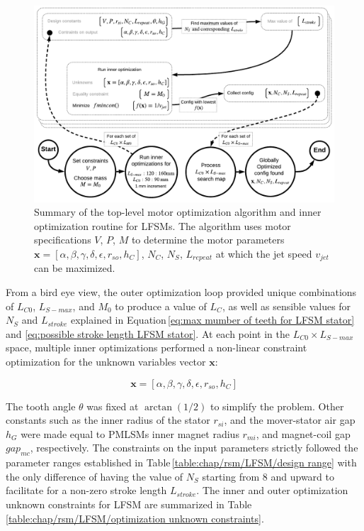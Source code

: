                 
                \begin{figure}
                  \centering
                  \includegraphics[width=5.9in]{chap4/images2/RSM_LFSM_optimization.pdf}
                  \caption{Summary of the top-level motor optimization algorithm and inner optimization routine for \acsp{LFSM}. The algorithm uses motor specifications $V$, $P$, $M$ to determine the motor parameters $\textbf{x}=[\alpha,\beta,\gamma,\delta,\epsilon,r_{so},h_C]$, $N_C$, $N_S$, $L_{repeat}$ at which the jet speed $v_{jet}$ can be maximized.}
                  \label{fig:chapter/rsm/fsm/top level optmization}
                \end{figure}
                
                
                From a bird eye view, the outer optimization loop provided unique combinations of $L_{C0}$, $L_{S-max}$, and $M_0$ to produce a value of $L_C$, as well as sensible values for $N_S$ and $L_{stroke}$ explained in Equation\,\ref{eq:max mumber of teeth for LFSM stator} and \ref{eq:possible stroke length LFSM stator}. At each point in the $L_{C0} \times L_{S-max}$ space, multiple inner optimizations performed a non-linear constraint optimization for the unknown variables vector $\textbf{x}$:
            
            
                \begin{equation}
                    \textbf{x} = \left[ \alpha,\beta,\gamma,\delta,\epsilon,r_{so},h_{C} \right]
                    \label{eq:inner optimization x of FSM}
                \end{equation}
                
                
                The tooth angle $\theta$ was fixed at $\arctan(1/2)$ to simplify the problem. Other constants such as the inner radius of the stator $r_{si}$, and the mover-stator air gap $h_G$ were made equal to \acsp{PMLSM} inner magnet radius $r_{mi}$, and magnet-coil gap $gap_{mc}$, respectively. The constraints on the input parameters strictly followed the parameter ranges established in Table\,\ref{table:chap/rsm/LFSM/design range} with the only difference of having the value of $N_S$ starting from $8$ and upward to facilitate for a non-zero stroke length $L_{stroke}$. The inner and outer optimization unknown constraints for \acs{LFSM} are summarized in Table\,\ref{table:chap/rsm/LFSM/optimization unknown constraints}.
                
